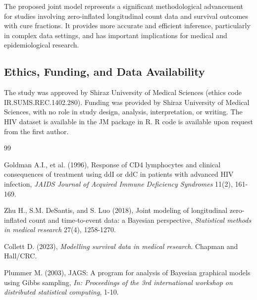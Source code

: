 \documentclass[twoside]{article}
\begin{document}
The proposed joint model represents a significant methodological advancement for studies involving zero-inflated longitudinal count data and survival outcomes with cure fractions. It provides more accurate and efficient inference, particularly in complex data settings, and has important implications for medical and epidemiological research.

\subsection*{Ethics, Funding, and Data Availability}

The study was approved by Shiraz University of Medical Sciences (ethics code IR.SUMS.REC.1402.280). Funding was provided by Shiraz University of Medical Sciences, with no role in study design, analysis, interpretation, or writing. The HIV dataset is available in the JM package in R. R code is available upon request from the first author.



\begin{thebibliography}{99}

Goldman A.I., et al. (1996), Response of CD4 lymphocytes and clinical consequences of treatment using ddI or ddC in patients with advanced HIV infection, {\it JAIDS Journal of Acquired Immune Deficiency Syndromes} 11(2), 161-169.

Zhu H., S.M. DeSantis, and S. Luo (2018), Joint modeling of longitudinal zero-inflated count and time-to-event data: a Bayesian perspective, {\it Statistical methods in medical research} 27(4), 1258-1270.

Collett D. (2023), {\it Modelling survival data in medical research}. Chapman and Hall/CRC.

Plummer M. (2003), JAGS: A program for analysis of Bayesian graphical models using Gibbs sampling, {\it In: Proceedings of the 3rd international workshop on distributed statistical computing}, 1-10.

\end{thebibliography}
 
\end{document}
